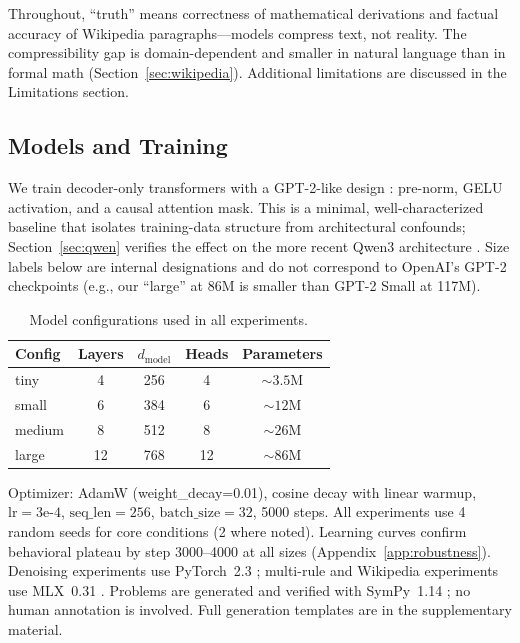 \documentclass{article}
\begin{document}
Throughout, ``truth'' means correctness of mathematical derivations and factual accuracy of Wikipedia paragraphs---models compress text, not reality. The compressibility gap is domain-dependent and smaller in natural language than in formal math (Section~\ref{sec:wikipedia}). Additional limitations are discussed in the Limitations section.

\subsection{Models and Training}
\label{sec:models}

We train decoder-only transformers with a GPT-2-like design \citep{radford2019language}: pre-norm, GELU activation, and a causal attention mask. This is a minimal, well-characterized baseline that isolates training-data structure from architectural confounds; Section~\ref{sec:qwen} verifies the effect on the more recent Qwen3 architecture \citep{yang2025qwen3}. Size labels below are internal designations and do not correspond to OpenAI's GPT-2 checkpoints (e.g., our ``large'' at 86M is smaller than GPT-2 Small at 117M).

\begin{table}[h]
\centering
\small
\begin{tabular}{lcccc}
\toprule
Config & Layers & $d_{\text{model}}$ & Heads & Parameters \\
\midrule
tiny   & 4  & 256 & 4  & ${\sim}3.5$M \\
small  & 6  & 384 & 6  & ${\sim}12$M \\
medium & 8  & 512 & 8  & ${\sim}26$M \\
large  & 12 & 768 & 12 & ${\sim}86$M \\
\bottomrule
\end{tabular}
\caption{Model configurations used in all experiments.}
\label{tab:models}
\end{table}

Optimizer: AdamW (weight\_decay=0.01), cosine decay with linear warmup, $\text{lr}=3\text{e-}4$, $\text{seq\_len}=256$, $\text{batch\_size}=32$, 5000 steps. All experiments use 4 random seeds for core conditions (2 where noted). Learning curves confirm behavioral plateau by step 3000--4000 at all sizes (Appendix~\ref{app:robustness}). Denoising experiments use PyTorch~2.3 \citep{paszke2019pytorch}; multi-rule and Wikipedia experiments use MLX~0.31 \citep{mlx2023}. Problems are generated and verified with SymPy~1.14 \citep{meurer2017sympy}; no human annotation is involved. Full generation templates are in the supplementary material.
\end{document}
